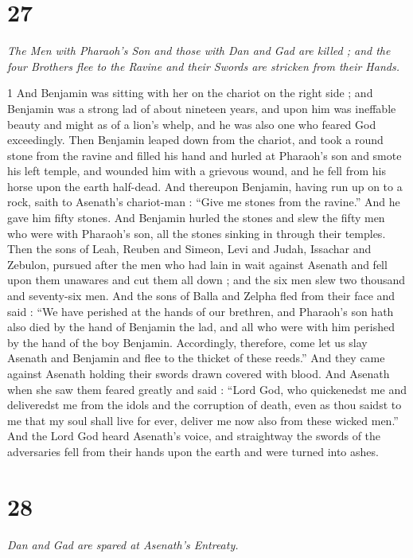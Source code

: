 \chapter{27}

\par \textit{The Men with Pharaoh's Son and those with Dan and Gad are killed ; and the four Brothers flee to the Ravine and their Swords are stricken from their Hands.}


1 And Benjamin was sitting with her on the chariot on the right side ; and Benjamin was a strong lad of about nineteen years, and upon him was ineffable beauty and might as of a lion's whelp, and he was also one who feared God exceedingly. Then Benjamin leaped down from the chariot, and took a round stone from the ravine and filled his hand and hurled at Pharaoh's son and smote his left temple, and wounded him with a grievous wound, and he fell from his horse upon the earth half-dead. And thereupon Benjamin, having run up on to a rock, saith to Asenath's chariot-man : “Give me stones from the ravine.” And he gave him fifty stones. And Benjamin hurled the stones and slew the fifty men who were with Pharaoh's son, all the stones sinking in through their temples. Then the sons of Leah, Reuben and Simeon, Levi and Judah, Issachar and Zebulon, pursued after the men who had lain in wait against Asenath and fell upon them unawares and cut them all down ; and the six men slew two thousand and seventy-six men. And the sons of Balla and Zelpha fled from their face and said : “We have perished at the hands of our brethren, and Pharaoh's son hath also died by the hand of Benjamin the lad, and all who were with him perished by the hand of the boy Benjamin. Accordingly, therefore, come let us slay Asenath and Benjamin and flee to the thicket of these reeds.” And they came against Asenath holding their swords drawn covered with blood. And Asenath when she saw them feared greatly and said : “Lord God, who quickenedst me and deliveredst me from the idols and the corruption of death, even as thou saidst to me that my soul shall live for ever, deliver me now also from these wicked men.” And the Lord God heard Asenath's voice, and straightway the swords of the adversaries fell from their hands upon the earth and were turned into ashes.

\chapter{28}

\par \textit{Dan and Gad are spared at Asenath's Entreaty.}


